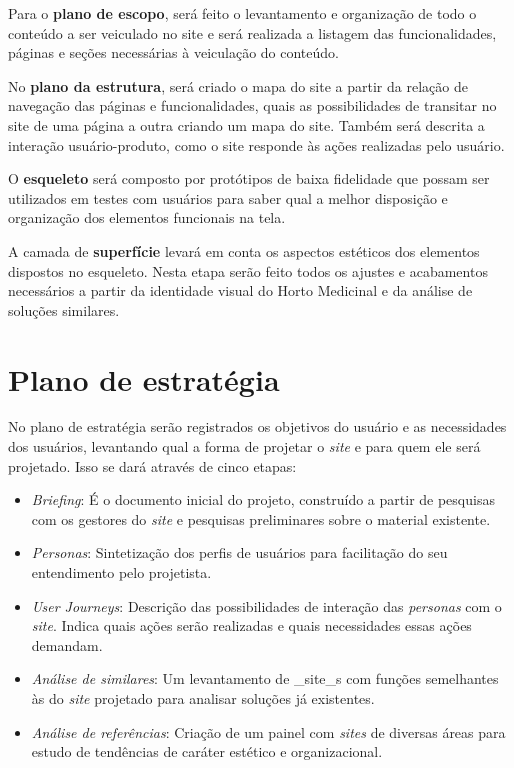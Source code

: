 Para o \textbf{plano de escopo}, será feito o levantamento e organização de todo o conteúdo a ser veiculado no site e será realizada a listagem das funcionalidades, páginas e seções necessárias à veiculação do conteúdo.

No \textbf{plano da estrutura}, será criado o mapa do site a partir da relação de navegação das páginas e funcionalidades, quais as possibilidades de transitar no site de uma página a outra criando um mapa do site. Também será descrita a interação usuário-produto, como o site responde às ações realizadas pelo usuário.

O \textbf{esqueleto} será composto por protótipos de baixa fidelidade que possam ser utilizados em testes com usuários para saber qual a melhor disposição e organização dos elementos funcionais na tela.

A camada de \textbf{superfície} levará em conta os aspectos estéticos dos elementos dispostos no esqueleto. Nesta etapa serão feito todos os ajustes e acabamentos necessários a partir da identidade visual do Horto Medicinal e da análise de soluções similares.

\chapter{Plano de estratégia}\label{plano-de-estrategia}

No plano de estratégia serão registrados os objetivos do usuário e as necessidades dos usuários, levantando qual a forma de projetar o \emph{site} e para quem ele será projetado. Isso se dará através de cinco etapas:

\begin{itemize}
\item
  \emph{Briefing}: É o documento inicial do projeto, construído a partir de pesquisas com os gestores do \emph{site} e pesquisas preliminares sobre o material existente.
\item
  \emph{Personas}: Sintetização dos perfis de usuários para facilitação do seu entendimento pelo projetista.
\item
  \emph{User Journeys}: Descrição das possibilidades de interação das \emph{personas} com o \emph{site}. Indica quais ações serão realizadas e quais necessidades essas ações demandam.
\item
  \emph{Análise de similares}: Um levantamento de \_site\_s com funções semelhantes às do \emph{site} projetado para analisar soluções já existentes.
\item
  \emph{Análise de referências}: Criação de um painel com \emph{sites} de diversas áreas para estudo de tendências de caráter estético e organizacional.
\end{itemize}

